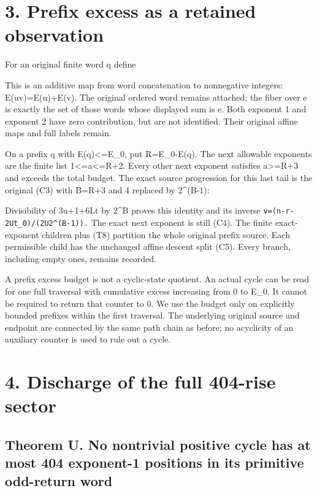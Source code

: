 \section{3. Prefix excess as a retained observation}

For an original finite word q define


This is an additive map from word concatenation to nonnegative integers:
E(uv)=E(u)+E(v). The original ordered word remains attached; the fiber
over e is exactly the set of those words whose displayed sum is e. Both
exponent 1 and exponent 2 have zero contribution, but are not
identified. Their original affine maps and full labels remain.

On a prefix q with E(q)\textless=E\_0, put R=E\_0-E(q). The next
allowable exponents are the finite list 1\textless=a\textless=R+2. Every
other next exponent satisfies a\textgreater=R+3 and exceeds the total
budget. The exact source progression for this last tail is the original
(C3) with B=R+3 and 4 replaced by 2\^{}(B-1):


Divisibility of 3u+1+6Lt by 2\^{}B proves this identity and its inverse
\nolinkurl{v=(n-r-2Ut_0)/(2U2^(B-1)).} The exact next exponent is still
(C4). The finite exact-exponent children plus (T8) partition the whole
original prefix source. Each permissible child has the unchanged affine
descent split (C5). Every branch, including empty ones, remains
recorded.

A prefix excess budget is not a cyclic-state quotient. An actual cycle
can be read for one full traversal with cumulative excess increasing
from 0 to E\_0. It cannot be required to return that counter to 0. We
use the budget only on explicitly bounded prefixes within the first
traversal. The underlying original source and endpoint are connected by
the same path chain as before; no acyclicity of an auxiliary counter is
used to rule out a cycle.

\section{4. Discharge of the full 404-rise sector}

\subsection{Theorem U. No nontrivial positive cycle has at most 404
exponent-1 positions in its primitive odd-return word}


